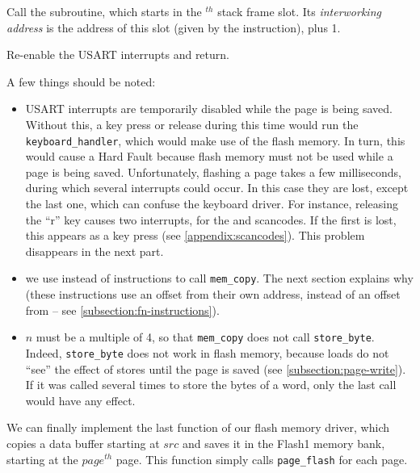 \begin{Paragraph}
\begin{paracol}{2}
Call the subroutine, which starts in the
$^{th}$ stack frame slot. Its {\em
interworking address} is the address of this slot (given by the 
instruction), plus 1.


Re-enable the USART interrupts and return.

\end{paracol}
\end{Paragraph}

\noindent A few things should be noted:
\begin{itemize}
\item USART interrupts are temporarily disabled while the page is being saved.
Without this, a key press or release during this time would run the
\verb!keyboard_handler!, which would make use of the flash memory. In turn,
this would cause a Hard Fault because flash memory must not be used while a
page is being saved. Unfortunately, flashing a page takes a few milliseconds,
during which several interrupts could occur. In this case they are lost, except
the last one, which can confuse the keyboard driver. For instance, releasing
the ``r'' key causes two interrupts, for the  and  scancodes.
If the first is lost, this appears as a key press (see
\cref{appendix:scancodes}). This problem disappears in the next part.

\item we use  instead of  instructions to call
\verb!mem_copy!. The next section explains why (these instructions use an
offset from their own address, instead of an offset from  -- see
\cref{subsection:fn-instructions}).

\item $n$ must be a multiple of 4, so that \verb!mem_copy! does not call
\verb!store_byte!. Indeed, \verb!store_byte! does not work in flash memory,
because loads do not ``see'' the effect of stores until the page is saved (see
\cref{subsection:page-write}). If it was called several times to store the
bytes of a word, only the last call would have any effect.
\end{itemize}

We can finally implement the last function of our flash memory driver, which
copies a data buffer starting at $src$ and saves it in the Flash1 memory bank,
starting at the $page^{th}$ page. This function simply calls \verb!page_flash!
for each page.

